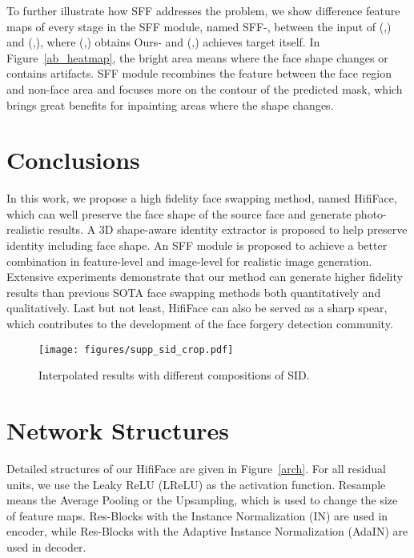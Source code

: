 \documentclass{article}
\begin{document}
To further illustrate how SFF addresses the problem, we show difference feature maps of every stage in the SFF module, named SFF-, between the input of (,) and (,), where (,) obtains Ours- and (,) achieves target itself. 
In Figure~\ref{ab_heatmap}, the bright area means where the face shape changes or contains artifacts. SFF module recombines the feature between the face region and non-face area and focuses more on the contour of the predicted mask, which brings great benefits for inpainting areas where the shape changes.



\section{Conclusions}
In this work, we propose a high fidelity face swapping method, named HifiFace, which can well preserve the face shape of the source face and generate photo-realistic results. A 3D shape-aware identity extractor is proposed to help preserve identity including face shape. An SFF module is proposed to achieve a better combination in feature-level and image-level for realistic image generation. Extensive experiments demonstrate that our method can generate higher fidelity results than previous SOTA face swapping methods both quantitatively and qualitatively. Last but not least, HifiFace can also be served as a sharp spear, which contributes to the development of the face forgery detection community.







\small 





\normalsize


\begin{figure*}[t] 
\begin{center} 
\texttt{[image: figures/supp\_sid\_crop.pdf]} 
\end{center} 
\caption{Interpolated results with different compositions of SID.} 
\label{supp_sid} 
\end{figure*}



\section*{Network Structures} 
Detailed structures of our HifiFace are given in Figure~\ref{arch}. For all residual units, we use the Leaky ReLU (LReLU) as the activation function. Resample means the Average Pooling or the Upsampling, which is used to change the size of feature maps. Res-Blocks with the Instance
Normalization (IN) are used in encoder, while  Res-Blocks with the Adaptive Instance Normalization (AdaIN) are used in decoder.
\end{document}
